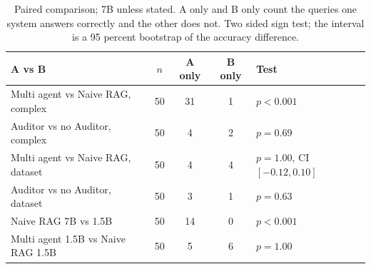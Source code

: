 \begin{table}[!tb]
\centering
\caption{Paired comparison; 7B unless stated. A only and B only count the queries one system answers correctly and the other does not. Two sided sign test; the interval is a 95 percent bootstrap of the accuracy difference.}
\label{tab:paired}
\small
\begin{tabular}{lcccl}
\toprule
A vs B & $n$ & A only & B only & Test \\
\midrule
Multi agent vs Naive RAG, complex & 50 & 31 & 1 & $p < 0.001$ \\
Auditor vs no Auditor, complex & 50 & 4 & 2 & $p = 0.69$ \\
Multi agent vs Naive RAG, dataset & 50 & 4 & 4 & $p = 1.00$, CI $[-0.12, 0.10]$ \\
Auditor vs no Auditor, dataset & 50 & 3 & 1 & $p = 0.63$ \\
Naive RAG 7B vs 1.5B & 50 & 14 & 0 & $p < 0.001$ \\
Multi agent 1.5B vs Naive RAG 1.5B & 50 & 5 & 6 & $p = 1.00$ \\
\bottomrule
\end{tabular}
\end{table}
